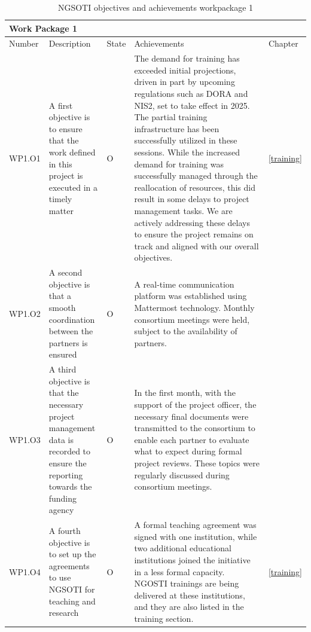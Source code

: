 \begin{table}[h]
\centering

\begin{tabular}{ |p{0.07\linewidth}  |p{0.2\linewidth}|        p{0.04\linewidth}|    p{0.62\linewidth}|  p{0.07\linewidth}|}\hline
\multicolumn{5}{|p{0.97\linewidth}|}{Work Package 1} \\
\hline
                  Number             & Description & State & Achievements & Chapter \\
\hline
WP1.O1 &
A first objective is to ensure that the work defined in this project is executed in a timely matter & O &

The demand for training has exceeded initial projections, driven in part by
upcoming regulations such as DORA and NIS2, set to take effect in 2025.
The partial training infrastructure has been successfully
utilized in these sessions. While the increased demand for training was
successfully managed through the reallocation of resources, this did result
in some delays to project management tasks. We are actively addressing these
delays to ensure the project remains on track and aligned with our overall
objectives.
&
\ref{training}
 \\
\hline
WP1.O2 &
A second objective is that a smooth coordination between the partners is ensured
&O &
A real-time communication platform was established using Mattermost technology.
Monthly consortium meetings were held, subject to the availability of partners.
&
\\

\hline

WP1.O3 &
A third objective is that the necessary project management data is recorded
to ensure the reporting towards the funding
agency
& O &
In the first month, with the support of the project officer, the necessary
final documents were transmitted to the consortium to enable each partner to
evaluate what to expect during formal project reviews.
These topics were regularly discussed during consortium meetings.
&

\\

\hline

WP1.O4 &
A fourth objective is to set up the agreements to use NGSOTI for teaching
and research
& O &
A formal teaching agreement was signed with one institution, while two additional educational institutions joined the initiative in a less formal capacity. NGOSTI trainings are being delivered at these institutions, and they are also listed in the training section.
&
\ref{training}
\\

\hline
\end{tabular}
\caption{NGSOTI objectives and achievements workpackage 1}
\label{wp1obj}
\end{table}



